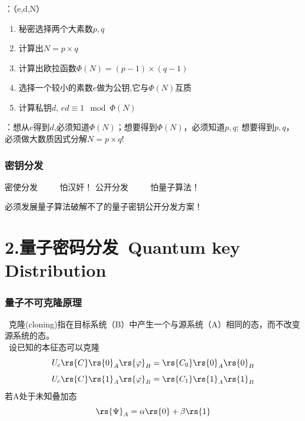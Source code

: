 \begin{frame}
    \frametitle{}
    {\color{red}{制备}}：（e,d,N）
    \begin{enumerate}
        \item 秘密选择两个大素数$p,q$
        \item 计算出$N=p\times q$
        \item 计算出欧拉函数$\Phi(N)=(p-1)\times (q-1)$
        \item 选择一个较小的素数$e$做为公钥,它与$\Phi(N)$互质
        \item 计算私钥$d$, $ed\equiv 1 \mod \Phi(N)$
    \end{enumerate}
     {\color{red}{破解}}：想从$e$得到$d$,必须知道$\Phi(N)$；想要得到$\Phi(N)$，必须知道$p,q$; 想要得到$p,q$，必须做大数质因式分解$N=p \times q$!
\end{frame}


\begin{frame}
    \frametitle{密钥分发}
    \begin{itemize}
        \Item 密使分发 $\qquad$ 怕汉奸！
        \Item 公开分发 $\qquad$ 怕量子算法！
    \end{itemize}
    必须发展量子算法破解不了的量子密钥公开分发方案！
\end{frame}

\section{2.量子密码分发~Quantum key Distribution}
\begin{frame}
    \frametitle{量子不可克隆原理}
    {\Bullet}~克隆(cloning)指在目标系统（B）中产生一个与源系统（A）相同的态，而不改变源系统的态。\\ \vspace{1em}
    \例[1.试证明未知量子态不可克隆]{}
    \证~设已知的本征态可以克隆
    \[ U_c\rs{C}\rs{0}_A\rs{\varphi}_B=\rs{C_0}\rs{0}_A\rs{0}_B\]
    \[ U_c\rs{C}\rs{1}_A\rs{\varphi}_B=\rs{C_1}\rs{1}_A\rs{1}_B\]
    若A处于未知叠加态\[ \rs{\Psi}_A=\alpha\rs{0}+\beta\rs{1}\]
\end{frame}

